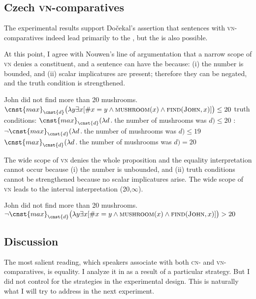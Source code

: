 \documentclass[output=paper, colorlinks, citecolor=brown, newtxmath]{langsci/langscibook}
\begin{document}
\subsection{Czech \textsc{vn-}comparatives}

The experimental results support Dočekal's assertion that sentences with \textsc{vn-}comparati\-ves indeed lead primarily to the , but the  is also possible.

At this point, I agree with Nouwen's line of argumentation that a narrow scope of \textsc{vn}  denies a constituent, and a sentence can have the  because: (i) the number is bounded, and (ii) scalar implicatures are present; therefore they can be negated, and the truth condition is strengthened.

\ea  John did not find more than 20 mushrooms.
	\ea $\cnst{max}_{\cnst{d}}\big(\lambda y\exists x[\#x=y \wedge \textsc{mushroom}(x) \wedge \textsc{find}(\textsc{John},x)]\big) \leq 20$ \label{ex:e_exh}
 \ex truth conditions: $\cnst{max}_{\cnst{d}}(\lambda d\,.\,$the number of mushrooms was $d)\leq 20$ \label{ex:tc}
	\ex {}: $\neg\cnst{max}_{\cnst{d}}(\lambda d\,.\,$the number of mushrooms was $d)\leq 19$ \label{ex:si}
	\ex $\cnst{max}_{\cnst{d}}(\lambda d\,.\,$the number of mushrooms was $d) = 20$ \label{ex:max}
\z
\z

\noindent The wide scope of \textsc{vn}  denies the whole proposition and the equality interpretation cannot occur because (i) the number is unbounded, and (ii) truth conditions cannot be strengthened because no scalar implicatures arise. The wide scope of \textsc{vn} leads to the interval interpretation (20,$\infty$).

\ea  John did not find more than 20 mushrooms.
\ea $\neg \cnst{max}_{\cnst{d}}\big(\lambda y\exists x[\#x=y \wedge \textsc{mushroom}(x) \wedge \textsc{find}(\textsc{John},x)]\big) > 20$ \label{ex:e_int}
\z
\z

\subsection{Discussion}

The most salient reading, which  speakers associate with both \textsc{cn-} and \textsc{vn-}compa\-ratives, is equality. I analyze it in  as a result of a particular  strategy. But I did not control for the  strategies in the experimental design. This is naturally what I will try to address in the next experiment.
\end{document}

